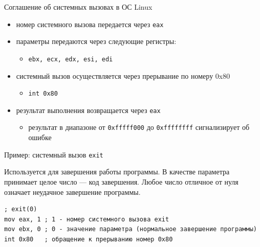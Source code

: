 \documentclass[utf8, russian, aspectratio=1610]{beamer}
\begin{document}
\begin{frame}{Соглашение об системных вызовах в ОС Linux}

    \begin{itemize}
        \item номер системного вызова передается через {\tt eax}
        \item параметры передаются через следующие регистры:
        \begin{itemize}
            \item {\tt ebx, ecx, edx, esi, edi}
        \end{itemize}
        \item системный вызов осуществляется через прерывание по номеру 0x80
        \begin{itemize}
            \item {\tt int 0x80}
        \end{itemize}
        \item результат выполнения возвращается через  {\tt eax}
        \begin{itemize}
            \item результат в диапазоне от {\tt 0xfffff000} до {\tt  0xffffffff} сигнализирует об ошибке
        \end{itemize}
    \end{itemize}
\end{frame}

\begin{frame}[fragile]{Пример: системный вызов {\tt exit}}

Используется для завершения работы программы. В качестве параметра принимает целое число --- код завершения. Любое число отличное от нуля означает неудачное завершение программы.

\begin{verbatim}
; exit(0) 
mov eax, 1 ; 1 - номер системного вызова exit
mov ebx, 0 ; 0 - значение параметра (нормальное завершение программы)
int 0x80   ; обращение к прерыванию номер 0x80 
\end{verbatim}
\end{frame}
\end{document}
